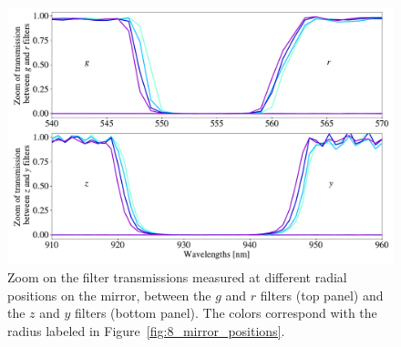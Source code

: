 \begin{figure}[h]
    \centering
    \includegraphics[width=1\columnwidth]{fig/blue_shift_filter_edges.pdf}
    \caption{Zoom on the \SD filter transmissions measured at different radial positions on the mirror, between the $g$ and $r$ filters (top panel) and the $z$ and $y$ filters (bottom panel). The colors correspond with the radius labeled in Figure~\ref{fig:8_mirror_positions}.}
    \label{fig:blueshift}
\end{figure}

%
%









	